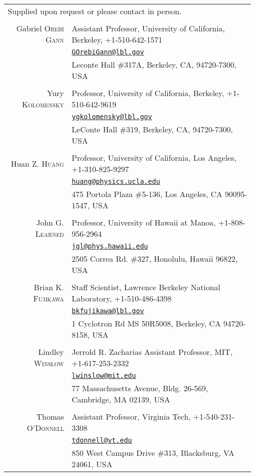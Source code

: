 \documentclass[11pt]{article} %
\begin{document}
\noindent\begin{tabular}{rp{12cm}}
\multicolumn{2}{l}{\footnotesize{Supplied upon request or please contact in
	person.}}\\
\multicolumn{2}{c}{}\\

Gabriel \textsc{Orebi Gann} & Assistant Professor, University of California, Berkeley, +1-510-642-1571\\
& \href{mailto:GOrebiGann@lbl.gov}{\nolinkurl{GOrebiGann@lbl.gov}}\\
& Leconte Hall \#317A, Berkeley, CA, 94720-7300, USA\\
\\
Yury \textsc{Kolomensky} & Professor, University of California, Berkeley, +1-510-642-9619\\
& \href{mailto:ygkolomensky@lbl.gov}{\nolinkurl{ygkolomensky@lbl.gov}}\\
& LeConte Hall \#319, Berkeley, CA, 94720-7300, USA\\
\\
Huan Z. \textsc{Huang} & Professor, University of California, Los Angeles, +1-310-825-9297\\
& \href{mailto:huang@physics.ucla.edu}{\nolinkurl{huang@physics.ucla.edu}}\\
& 475 Portola Plaza \#5-136, Los Angeles, CA 90095-1547, USA\\
\\
John G. \textsc{Learned} & Professor, University of Hawaii at Manoa, +1-808-956-2964\\
& \href{mailto:jgl@phys.hawaii.edu}{\nolinkurl{jgl@phys.hawaii.edu}}\\
& 2505 Correa Rd. \#327, Honolulu, Hawaii 96822, USA\\
\\
Brian K. \textsc{Fujikawa} & Staff Scientist, Lawrence Berkeley National Laboratory, +1-510-486-4398\\
& \href{mailto:bkfujikawa@lbl.gov}{\nolinkurl{bkfujikawa@lbl.gov}}\\
& 1 Cyclotron Rd MS 50R5008, Berkeley, CA 94720-8158, USA\\
\\
Lindley \textsc{Winslow} & Jerrold R. Zacharias Assistant Professor, MIT, +1-617-253-2332\\
& \href{mailto:lwinslow@mit.edu}{\nolinkurl{lwinslow@mit.edu}}\\ 
& 77 Massachusetts Avenue, Bldg. 26-569, Cambridge, MA 02139, USA\\
\\
Thomas \textsc{O'Donnell} & Assistant Professor, Virginia Tech, +1-540-231-3308\\
& \href{mailto:tdonnell@vt.edu}{\nolinkurl{tdonnell@vt.edu}}\\
& 850 West Campus Drive \#313, Blacksburg, VA 24061, USA\\


\end{tabular}
\end{document}
